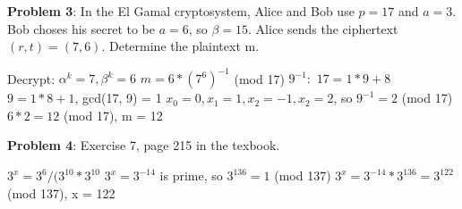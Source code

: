 \documentclass[12pt,letterpaper,final]{report}
\begin{document}
\bigskip
\noindent\textbf{Problem 3}: In the El Gamal cryptosystem, Alice and Bob use $p = 17$ and $a = 3$. Bob choses his secret to be $a = 6$, so $\beta = 15$. Alice sends the ciphertext $(r,t) = (7,6)$. Determine the plaintext m.

Decrypt: $\alpha^{k} = 7, \beta^{k} = 6$
\newline $m  = 6 * (7^{6})^{-1}$ (mod 17)
\newline $9^{-1}:$
\newline $17 = 1*9 + 8$
\newline $9 = 1*8 + 1$, gcd(17, 9) = 1
\newline $x_0 = 0, x_1 = 1, x_2 = -1, x_2 = 2$, so $9^{-1} = 2$ (mod 17)
\newline $6 * 2 = 12$ (mod 17), m = 12

\bigskip
\noindent\textbf{Problem 4}: Exercise 7, page 215 in the texbook.

$3^{x} = 3^{6} / (3^{10} * 3^{10}$
\newline $3^{x} = 3^{-14}$
 is prime, so $3^{136} = 1$ (mod 137)
\newline $3^{x} = 3^{-14} * 3^{136} = 3^{122}$ (mod 137), x = 122
\end{document}
